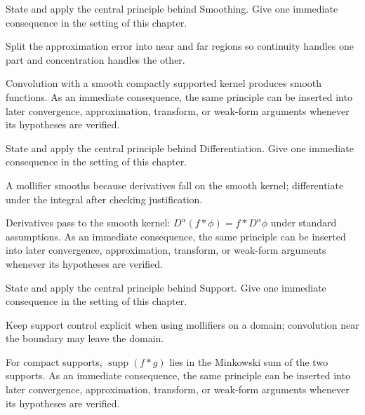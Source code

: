 \begin{exercise}\label{exr:iii10-06}
State and apply the central principle behind Smoothing. Give one immediate consequence in the setting of this chapter.
\end{exercise}
\begin{hint}
Split the approximation error into near and far regions so continuity handles one part and concentration handles the other.
\end{hint}
\begin{solution}
Convolution with a smooth compactly supported kernel produces smooth functions. As an immediate consequence, the same principle can be inserted into later convergence, approximation, transform, or weak-form arguments whenever its hypotheses are verified.
\end{solution}

\begin{exercise}\label{exr:iii10-07}
State and apply the central principle behind Differentiation. Give one immediate consequence in the setting of this chapter.
\end{exercise}
\begin{hint}
A mollifier smooths because derivatives fall on the smooth kernel; differentiate under the integral after checking justification.
\end{hint}
\begin{solution}
Derivatives pass to the smooth kernel: $D^\alpha(f*\phi)=f*D^\alpha\phi$ under standard assumptions. As an immediate consequence, the same principle can be inserted into later convergence, approximation, transform, or weak-form arguments whenever its hypotheses are verified.
\end{solution}

\begin{exercise}\label{exr:iii10-08}
State and apply the central principle behind Support. Give one immediate consequence in the setting of this chapter.
\end{exercise}
\begin{hint}
Keep support control explicit when using mollifiers on a domain; convolution near the boundary may leave the domain.
\end{hint}
\begin{solution}
For compact supports, $\operatorname{supp}(f*g)$ lies in the Minkowski sum of the two supports. As an immediate consequence, the same principle can be inserted into later convergence, approximation, transform, or weak-form arguments whenever its hypotheses are verified.
\end{solution}


